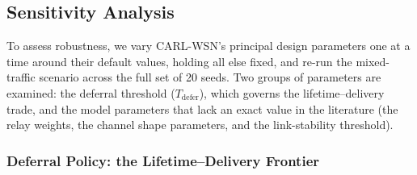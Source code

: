 \documentclass[12pt]{article}
\begin{document}
\begin{table}[!t]
\renewcommand{\arraystretch}{1.2}
\caption{CARL-WSN versus RL Baselines --- Mixed Traffic (CARL-WSN value vs.\ baseline value)}
\label{tab:rl_compare}
\centering
{}
\end{table}

\subsection{Sensitivity Analysis}
\label{sec:sensitivity}

To assess robustness, we vary CARL-WSN's principal design parameters
one at a time around their default values, holding all else fixed,
and re-run the mixed-traffic scenario across the full set of 20
seeds. Two groups of parameters are examined: the deferral threshold
($T_{\mathrm{defer}}$), which governs the lifetime--delivery trade,
and the model parameters that lack an exact value in the literature
(the relay weights, the channel shape parameters, and the
link-stability threshold).

\subsubsection{Deferral Policy: the Lifetime--Delivery Frontier}
\end{document}
